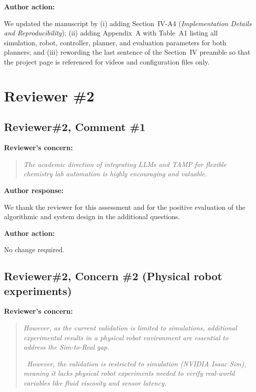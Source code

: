 \documentclass[11pt]{article}
\newif\ifshowstatus
\newcommand{\statusline}[2]{\ifshowstatus\par\noindent\textcolor{status#1}{\textbf{Status: \MakeUppercase{#1}.} #2}\par\smallskip\fi}
\newcommand{\reviewer}[1]{\clearpage\section*{#1}}
\newenvironment{concern}[3][pending]{\subsection*{\ifshowstatus\textcolor{status#1}{#2}\else#2\fi}\statusline{#1}{#3}\textbf{Reviewer's concern:}\begin{quote}\itshape}{\end{quote}}
\newenvironment{response}{\textbf{Author response:}\par\smallskip}{\par\medskip}
\newenvironment{action}{\textbf{Author action:}\par\smallskip}{\par\bigskip\noindent\hrulefill\par\bigskip}
\begin{document}
\begin{action}
We updated the manuscript by
(i) adding Section~IV-A4 (\emph{Implementation Details and Reproducibility});
(ii) adding Appendix~A with Table~A1 listing all simulation, robot, controller, planner, and evaluation parameters for both planners;
and (iii) rewording the last sentence of the Section~IV preamble so that the project page is referenced for videos and configuration files only.
\end{action}

\reviewer{Reviewer \#2}

\begin{concern}[complete]{Reviewer\#2, Comment \#1}{Acknowledgement only.}
The academic direction of integrating LLMs and TAMP for flexible chemistry lab automation is highly encouraging and valuable.
\end{concern}

\begin{response}
We thank the reviewer for this assessment and for the positive evaluation of the algorithmic and system design in the additional questions.
\end{response}

\begin{action}
No change required.
\end{action}

\begin{concern}[pending]{Reviewer\#2, Concern \#2 (Physical robot experiments)}{Needs A1--A4 and the new Section IV-F.}
However, as the current validation is limited to simulations, additional experimental results in a physical robot environment are essential to address the Sim-to-Real gap.

\itshape\
However, the validation is restricted to simulation (NVIDIA Isaac Sim), meaning it lacks physical robot experiments needed to verify real-world variables like fluid viscosity and sensor latency.
\end{concern}
\end{document}
